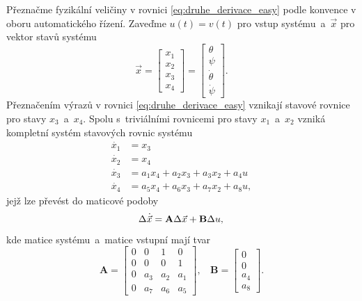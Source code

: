 \documentclass[conference]{IEEEtran}
\begin{document}
Přeznačme fyzikální veličiny v rovnici \eqref{eq:druhe_derivace_easy} podle konvence v oboru automatického řízení.
Zaveďme $u(t) = v(t)$ pro vstup systému~a~$\vec{x}$ pro vektor stavů systému
\begin{equation}
    \vec{x} = \begin{bmatrix}
        x_1 \\
        x_2 \\
        x_3 \\
        x_4
    \end{bmatrix} = \begin{bmatrix}
        \theta \\
        \psi \\
        \dot{\theta} \\
        \dot{\psi}
    \end{bmatrix}.
\end{equation}
Přeznačením výrazů v rovnici \eqref{eq:druhe_derivace_easy} vznikají stavové rovnice pro stavy $x_3$~a~$x_4$. 
Spolu s~triviálními rovnicemi pro stavy $x_1$~a~$x_2$ vzniká kompletní systém stavových rovnic systému
\begin{equation}
    \begin{split}
        \dot{x_1} &= x_3 \\
        \dot{x_2} &= x_4 \\
        \dot{x_3} & = a_1 x_4 + a_2 x_3 + a_3 x_2 + a_4 u \\
        \dot{x_4} &= a_5  x_4 + a_6 x_3 + a_7 x_2 + a_8 u,
        \label{eq:stavove_rovnice}
    \end{split}
\end{equation}
jejž lze převést do maticové podoby
\begin{equation}
    \Delta \dot{\vec{x}} = \mathbf{A} \Delta \vec{x} + \mathbf{B} \Delta u, \\
\end{equation}
kde matice systému~a~matice vstupní mají tvar
\begin{equation}
    \mathbf{A} = \begin{bmatrix}
        0 & 0 & 1 & 0 \\
        0 & 0 & 0 & 1 \\
        0 & a_3 & a_2 & a_1 \\
        0 & a_7 & a_6 & a_5
    \end{bmatrix}, ~~~~ \mathbf{B} = \begin{bmatrix}
        0 \\ 0 \\a_4 \\a_8
    \end{bmatrix}.
\end{equation}
\end{document}
